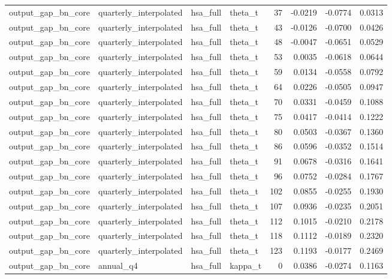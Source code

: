 \begin{tabular}{llllrrrr}
output\_gap\_bn\_core & quarterly\_interpolated & hsa\_full & theta\_t & 37 & -0.0219 & -0.0774 & 0.0313 \\
output\_gap\_bn\_core & quarterly\_interpolated & hsa\_full & theta\_t & 43 & -0.0126 & -0.0700 & 0.0426 \\
output\_gap\_bn\_core & quarterly\_interpolated & hsa\_full & theta\_t & 48 & -0.0047 & -0.0651 & 0.0529 \\
output\_gap\_bn\_core & quarterly\_interpolated & hsa\_full & theta\_t & 53 & 0.0035 & -0.0618 & 0.0644 \\
output\_gap\_bn\_core & quarterly\_interpolated & hsa\_full & theta\_t & 59 & 0.0134 & -0.0558 & 0.0792 \\
output\_gap\_bn\_core & quarterly\_interpolated & hsa\_full & theta\_t & 64 & 0.0226 & -0.0505 & 0.0947 \\
output\_gap\_bn\_core & quarterly\_interpolated & hsa\_full & theta\_t & 70 & 0.0331 & -0.0459 & 0.1088 \\
output\_gap\_bn\_core & quarterly\_interpolated & hsa\_full & theta\_t & 75 & 0.0417 & -0.0414 & 0.1222 \\
output\_gap\_bn\_core & quarterly\_interpolated & hsa\_full & theta\_t & 80 & 0.0503 & -0.0367 & 0.1360 \\
output\_gap\_bn\_core & quarterly\_interpolated & hsa\_full & theta\_t & 86 & 0.0596 & -0.0352 & 0.1514 \\
output\_gap\_bn\_core & quarterly\_interpolated & hsa\_full & theta\_t & 91 & 0.0678 & -0.0316 & 0.1641 \\
output\_gap\_bn\_core & quarterly\_interpolated & hsa\_full & theta\_t & 96 & 0.0752 & -0.0284 & 0.1767 \\
output\_gap\_bn\_core & quarterly\_interpolated & hsa\_full & theta\_t & 102 & 0.0855 & -0.0255 & 0.1930 \\
output\_gap\_bn\_core & quarterly\_interpolated & hsa\_full & theta\_t & 107 & 0.0936 & -0.0235 & 0.2051 \\
output\_gap\_bn\_core & quarterly\_interpolated & hsa\_full & theta\_t & 112 & 0.1015 & -0.0210 & 0.2178 \\
output\_gap\_bn\_core & quarterly\_interpolated & hsa\_full & theta\_t & 118 & 0.1112 & -0.0189 & 0.2320 \\
output\_gap\_bn\_core & quarterly\_interpolated & hsa\_full & theta\_t & 123 & 0.1193 & -0.0177 & 0.2469 \\
output\_gap\_bn\_core & annual\_q4 & hsa\_full & kappa\_t & 0 & 0.0386 & -0.0274 & 0.1163 \\

\end{tabular}
